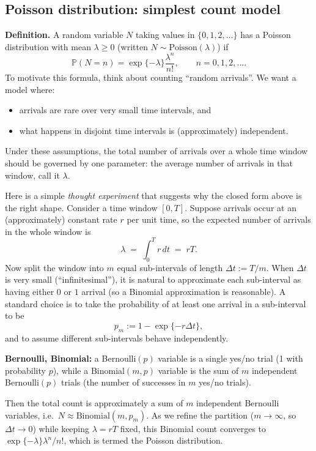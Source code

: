 \subsection{Poisson distribution: simplest count model}

\noindent\textbf{Definition.}
A random variable $N$ taking values in $\{0,1,2,\dots\}$ has a Poisson distribution with mean $\lambda\ge 0$ (written
$N\sim\mathrm{Poisson}(\lambda)$) if
$$
\mathbb{P}(N=n)=\exp\{-\lambda\}\frac{\lambda^n}{n!},\qquad n=0,1,2,\dots.
$$
To motivate this formula, think about counting ``random arrivals''.
We want a model where:
\begin{itemize}
    \item arrivals are rare over very small time intervals, and
    \item what happens in disjoint time intervals is (approximately) independent.
\end{itemize}
Under these assumptions, the total number of arrivals over a whole time window should be governed by one parameter: the
average number of arrivals in that window, call it $\lambda$.

Here is a simple \emph{thought experiment} that suggests why the closed form above is the right shape. Consider a time
window $[0,T]$. Suppose arrivals occur at an (approximately) constant rate $r$ per unit time, so the expected number of
arrivals in the whole window is
$$
\lambda \;=\; \int_0^T r\,dt \;=\; rT.
$$
Now split the window into $m$ equal sub-intervals of length $\Delta t := T/m$. When $\Delta t$ is very small
(``infinitesimal''), it is natural to approximate each sub-interval as having either $0$ or $1$ arrival 
(so a Binomial approximation is reasonable). A standard choice is to take the probability of at 
least one arrival in a sub-interval to be
$$
p_m := 1-\exp\{-r\Delta t\},
$$
and to assume different sub-intervals behave independently. 

\noindent\textbf{Bernoulli, Binomial:} a Bernoulli$(p)$ variable is a single yes/no trial (1 with
probability $p$), while a Binomial$(m,p)$ variable is the sum of $m$ independent Bernoulli$(p)$ trials (the number of
successes in $m$ yes/no trials).

Then the total count is approximately a sum of $m$
independent Bernoulli variables, i.e.\ $N\approx \mathrm{Binomial}(m,p_m)$.
As we refine the partition ($m\to\infty$, so $\Delta t\to 0$) while keeping $\lambda=rT$ fixed, this Binomial count
converges to $\exp\{-\lambda\}\lambda^n/n!$, which is termed the Poisson distribution.

